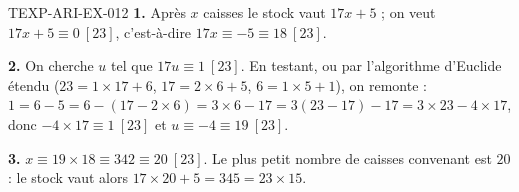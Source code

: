 \begin{corrige}{TEXP-ARI-EX-012}
\textbf{1.} Après $x$ caisses le stock vaut $17x+5$ ; on veut
$17x+5\equiv0\ [23]$, c'est-à-dire $17x\equiv-5\equiv18\ [23]$.

\textbf{2.} On cherche $u$ tel que $17u\equiv1\ [23]$. En testant, ou par
l'algorithme d'Euclide étendu ($23=1\times17+6$, $17=2\times6+5$,
$6=1\times5+1$), on remonte : $1=6-5=6-(17-2\times6)=3\times6-17
=3(23-17)-17=3\times23-4\times17$, donc $-4\times17\equiv1\ [23]$ et
$u\equiv-4\equiv19\ [23]$.

\textbf{3.} $x\equiv19\times18\equiv342\equiv20\ [23]$. Le plus petit nombre
de caisses convenant est $20$ : le stock vaut alors
$17\times20+5=345=23\times15$.
\end{corrige}
